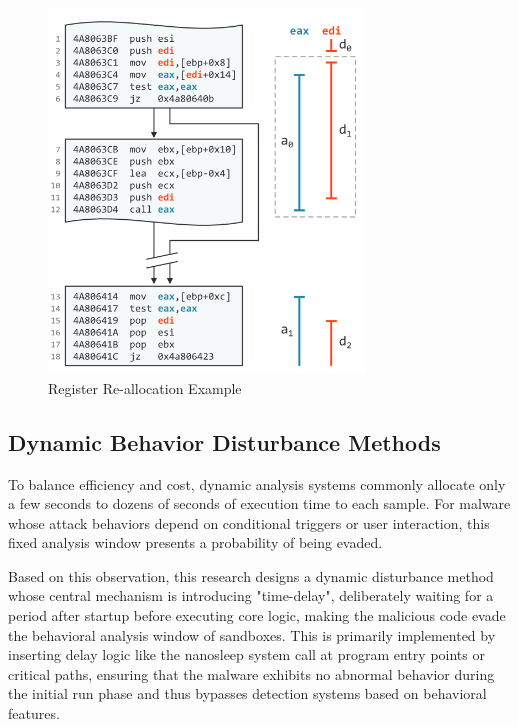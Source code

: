 \begin{figure}[hbt]
	\centering
	\includegraphics[width=0.75\textwidth]{figures/4.6}
	\caption{Register Re-allocation Example}\label{fig:4.6}
\end{figure}

\subsection{Dynamic Behavior Disturbance Methods}

To balance efficiency and cost, dynamic analysis systems commonly allocate only a few seconds to dozens of seconds of execution time to each sample. For malware whose attack behaviors depend on conditional triggers or user interaction, this fixed analysis window presents a probability of being evaded.

Based on this observation, this research designs a dynamic disturbance method whose central mechanism is introducing "time-delay", deliberately waiting for a period after startup before executing core logic, making the malicious code evade the behavioral analysis window of sandboxes. This is primarily implemented by inserting delay logic like the nanosleep system call at program entry points or critical paths, ensuring that the malware exhibits no abnormal behavior during the initial run phase and thus bypasses detection systems based on behavioral features.

